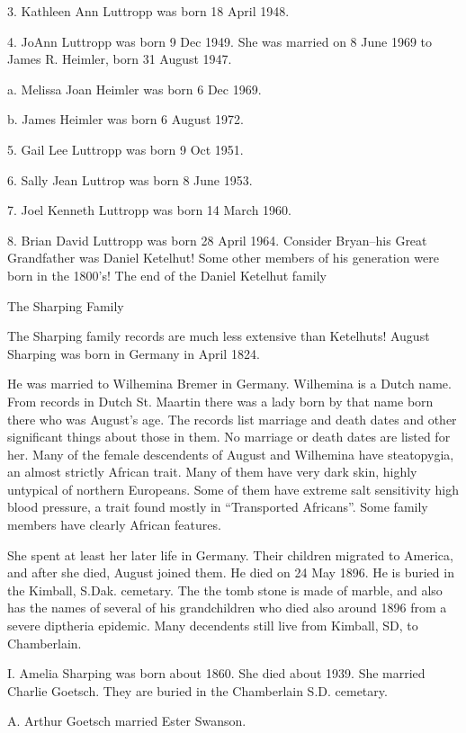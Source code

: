 \documentclass[a4paper]{article}
\begin{document}
3. Kathleen Ann Luttropp was born 18 April 1948.

4. JoAnn Luttropp was born 9 Dec 1949.  She was married on 8 June 1969 to James R. Heimler, born 31 August 1947.

a. Melissa Joan Heimler was born 6 Dec 1969.

b. James Heimler was born 6 August 1972.

5. Gail Lee Luttropp was born 9 Oct 1951.

6. Sally Jean Luttrop was born 8 June 1953.

7. Joel Kenneth Luttropp was born 14 March 1960.

8. Brian David Luttropp was born 28 April 1964.  Consider Bryan--his Great Grandfather was Daniel Ketelhut!  Some other members of his generation were born in the 1800's!
\vskip 4mm
 The end of the Daniel Ketelhut family 

\pagebreak

{\Huge \noindent The Sharping Family}
\vskip 5mm


The Sharping family records are much less extensive than Ketelhuts!  August Sharping was born in Germany in April 1824.  

He was married to Wilhemina Bremer in Germany.  Wilhemina is a Dutch name.  From records in Dutch St. Maartin there was a lady born by that name born there who was August's age.  The records list marriage and death dates and other significant things about those in them.  No marriage or death dates are listed for her.  Many of the female descendents of August and Wilhemina have steatopygia, an almost strictly African trait. Many of them have very dark skin, highly untypical of northern Europeans.  Some of them have extreme salt sensitivity high blood pressure, a trait found mostly in ``Transported Africans''.  Some family members have clearly African features.  

She spent at least  her later life in Germany.  Their children migrated to America, and after she died, August joined them.  He died on 24 May 1896.  He is buried in the Kimball, S.Dak. cemetary.  The the tomb stone is made of marble, and also has the names of several of his grandchildren who died also around 1896 from a severe diptheria epidemic.  Many decendents still live from Kimball, SD, to Chamberlain.

I. Amelia Sharping was born about 1860.  She died about 1939.  She married  Charlie Goetsch.  They are buried in the Chamberlain S.D. cemetary.  

A. Arthur Goetsch married Ester Swanson.
\end{document}
